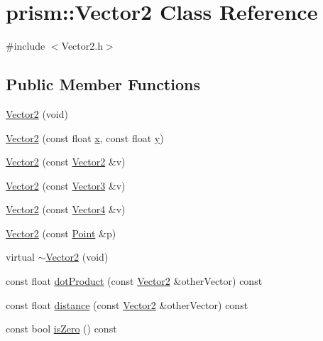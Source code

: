 \hypertarget{classprism_1_1_vector2}{}\section{prism\+:\+:Vector2 Class Reference}
\label{classprism_1_1_vector2}


{\ttfamily \#include $<$Vector2.\+h$>$}

\subsection*{Public Member Functions}
\begin{DoxyCompactItemize}
\item 
\hyperlink{classprism_1_1_vector2_a29d8912b19f7beb6c19d2c66c23d39a2}{Vector2} (void)
\item 
\hyperlink{classprism_1_1_vector2_a97bf11d5cfb424de6e1e08aea6e05c09}{Vector2} (const float \hyperlink{classprism_1_1_vector2_a03a3e6c084d4fda83cc688d22ffcf5bb}{x}, const float \hyperlink{classprism_1_1_vector2_a6656aa95639282560722da4b5da76423}{y})
\item 
\hyperlink{classprism_1_1_vector2_ad1c6e42316f2c2ce35b4ed98fa51c337}{Vector2} (const \hyperlink{classprism_1_1_vector2}{Vector2} \&v)
\item 
\hyperlink{classprism_1_1_vector2_a1a0101141991e43a9c3bfca9449bad59}{Vector2} (const \hyperlink{classprism_1_1_vector3}{Vector3} \&v)
\item 
\hyperlink{classprism_1_1_vector2_a6869031404a097577768cff206e9b7c2}{Vector2} (const \hyperlink{classprism_1_1_vector4}{Vector4} \&v)
\item 
\hyperlink{classprism_1_1_vector2_a375ed2db7c3f4e4d79544107a49b2841}{Vector2} (const \hyperlink{classprism_1_1_point}{Point} \&p)
\item 
virtual \hyperlink{classprism_1_1_vector2_a0ee0ad6b2d1f980943626bd033a586ef}{$\sim$\+Vector2} (void)
\item 
const float \hyperlink{classprism_1_1_vector2_a5196ceef92212020885fe124adca3924}{dot\+Product} (const \hyperlink{classprism_1_1_vector2}{Vector2} \&other\+Vector) const 
\item 
const float \hyperlink{classprism_1_1_vector2_ac900226efb6a6a9b12aa5e19dfb57bf7}{distance} (const \hyperlink{classprism_1_1_vector2}{Vector2} \&other\+Vector) const 
\item 
const bool \hyperlink{classprism_1_1_vector2_ac24bf6ff6ebc3da7cba3cee1087f9fa4}{is\+Zero} () const 
\item 

\end{DoxyCompactItemize}
